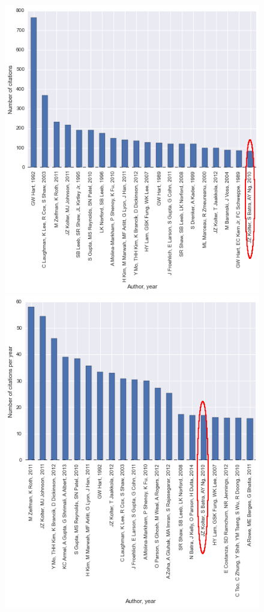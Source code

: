 \begin{figure}[H]
	\label{fig:citations}
	\centering
	\begin{minipage}{.45\textwidth}
		\includegraphics[scale=0.35]{./figures/citations_mod}
	\end{minipage}
	\begin{minipage}{.45\textwidth}
		\includegraphics[scale=0.33]{./figures/citationsperyear_mod}

\end{minipage}
\end{figure}
